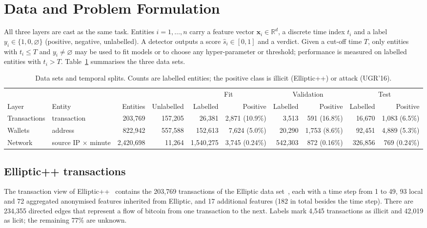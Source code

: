 \section{Data and Problem Formulation}\label{sec:data}

All three layers are cast as the same task. Entities $i = 1, \dots, n$ carry a feature vector $\mathbf{x}_i \in \mathbb{R}^d$, a discrete time index $t_i$ and a label $y_i \in \{1, 0, \varnothing\}$ (positive, negative, unlabelled). A detector outputs a score $\hat{s}_i \in [0,1]$ and a verdict. Given a cut-off time $T$, only entities with $t_i \le T$ and $y_i \neq \varnothing$ may be used to fit models or to choose any hyper-parameter or threshold; performance is measured on labelled entities with $t_i > T$. Table~\ref{tab:data} summarises the three data sets.

\begin{table}[t]
\caption{Data sets and temporal splits. Counts are labelled entities; the positive class is illicit (Elliptic++) or attack (UGR'16).}\label{tab:data}
\centering
\begin{tabular}{llrrrrrrrr}
\toprule
 & & & & \multicolumn{2}{c}{Fit} & \multicolumn{2}{c}{Validation} & \multicolumn{2}{c}{Test} \\
\cmidrule(lr){5-6}\cmidrule(lr){7-8}\cmidrule(lr){9-10}
Layer & Entity & Entities & Unlabelled & Labelled & Positive & Labelled & Positive & Labelled & Positive \\
\midrule
Transactions & transaction & 203,769 & 157,205 & 26,381 & 2,871 (10.9\%) & 3,513 & 591 (16.8\%) & 16,670 & 1,083 (6.5\%) \\
Wallets & address & 822,942 & 557,588 & 152,613 & 7,624 (5.0\%) & 20,290 & 1,753 (8.6\%) & 92,451 & 4,889 (5.3\%) \\
Network & source IP $\times$ minute & 2,420,698 & 11,264 & 1,540,275 & 3,745 (0.24\%) & 542,303 & 872 (0.16\%) & 326,856 & 769 (0.24\%) \\
\bottomrule
\end{tabular}
\end{table}

\subsection{Elliptic++ transactions}
The transaction view of Elliptic++~\cite{elmougy2023} contains the 203,769 transactions of the Elliptic data set~\cite{weber2019}, each with a time step from 1 to 49, 93 local and 72 aggregated anonymised features inherited from Elliptic, and 17 additional features (182 in total besides the time step). There are 234,355 directed edges that represent a flow of bitcoin from one transaction to the next. Labels mark 4,545 transactions as illicit and 42,019 as licit; the remaining 77\% are unknown. %

